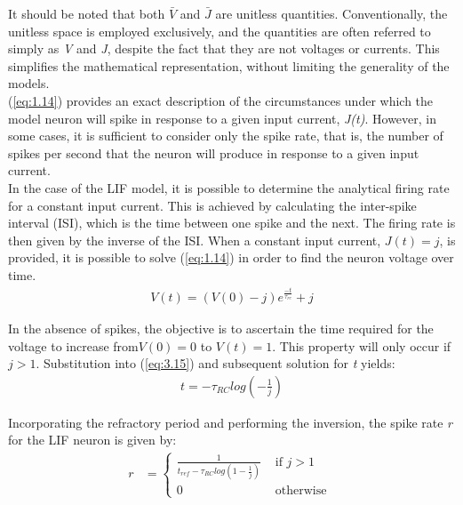 \noindent It should be noted that both $\bar{V}$ and $\bar{J}$ are unitless quantities. Conventionally, the unitless space is employed exclusively, and the quantities are often referred to simply as \textit{V} and \textit{J}, despite the fact that they are not voltages or currents. This simplifies the mathematical representation, without limiting the generality of the models. \\

\noindent (\ref{eq:1.14}) provides an exact description of the circumstances under which the model neuron will spike in response to a given input current, \textit{J(t)}. However, in some cases, it is sufficient to consider only the spike rate, that is, the number of spikes per second that the neuron will produce in response to a given input current. \\

\noindent In the case of the LIF model, it is possible to determine the analytical firing rate for a constant input current. This is achieved by calculating the inter-spike interval (ISI), which is the time between one spike and the next. The firing rate is then given by the inverse of the ISI. When a constant input current, $J(t) = j$, is provided, it is possible to solve (\ref{eq:1.14}) in order to find the neuron voltage over time. 
\begin{align}
    V(t) = (V(0) - j)e^{\frac{-t}{\tau_{rc}}} + j \label{eq:1.15}
\end{align}

\noindent In the absence of spikes, the objective is to ascertain the time required for the voltage to increase from$ V(0) = 0$ to $V(t) = 1$. This property will only occur if $j > 1$. Substitution into (\ref{eq:3.15}) and subsequent solution for \textit{t} yields:
\begin{align}
    t = - \tau_{RC} log \left( - \frac{1}{j} \right) \label{eq:1.16}
\end{align}

\noindent Incorporating the refractory period and performing the inversion, the spike rate \textit{r} for the LIF neuron is given by:
\begin{align}
    r &= \begin{cases}
    \frac{1}{t_{ref} - \tau_{RC} log \left( 1 - \frac{1}{j} \right)} & \text{ if } j > 1 \\ 
    0 & \text{ otherwise }  
    \end{cases} \label{eq:1.17}
\end{align}


